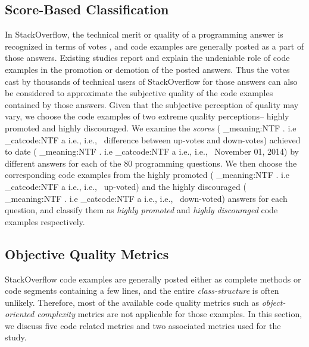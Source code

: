 \documentclass[conference]{IEEEtran}
\makeatletter
\newcommand\latinabbrev[1]{
  \peek_meaning:NTF . {%
    #1\@}%
  { \peek_catcode:NTF a {%
      #1., \@ }%
    {#1., \@}}}
\def\eg{\latinabbrev{e.g}}
\def\ie{\latinabbrev{i.e}}
\makeatother
\begin{document}
\subsection{Score-Based Classification}\label{sec:voteclass}
In StackOverflow, the technical merit or quality of a programming answer is recognized in terms of votes \cite{nasehi}, and code examples are generally posted as a part of those answers. Existing studies \cite{nasehi, nier} report and explain the undeniable role of code examples in the promotion or demotion of the posted answers. Thus the votes cast by thousands of technical users of StackOverflow for those answers can also be considered to approximate the subjective quality of the code examples contained by those answers. Given that the subjective perception of quality may vary, we choose the code examples of two extreme quality perceptions-- highly promoted and highly discouraged. We examine the \emph{scores} (\ie\ difference between up-votes and down-votes) 
achieved to date (\ie\ November 01, 2014) by different answers for each of the 80 programming questions. We then choose the corresponding code examples from the highly promoted (\ie\ up-voted) and the highly discouraged (\ie\ down-voted) answers for each question, and classify them as \emph{highly promoted} and \emph{highly discouraged} code examples respectively.
\vspace{-.1cm}
\subsection{Objective Quality Metrics}
\label{sec:metrics}
StackOverflow code examples are generally posted either as complete methods or code segments containing a few lines, and the entire \emph{class-structure} is often unlikely. Therefore, most of the available code quality metrics such as \emph{object-oriented complexity} metrics are not applicable for those examples. In this section, we discuss five code related metrics and two associated metrics used for the study. 
\end{document}
